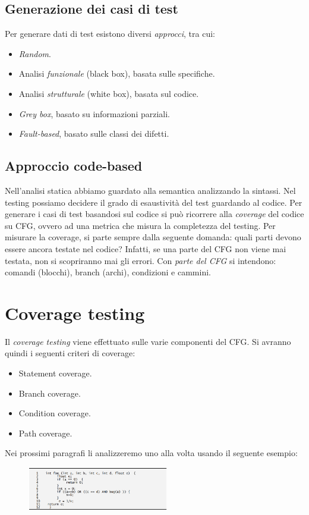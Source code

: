 \documentclass[a4paper,oneside,titlepage]{book}
\begin{document}
\subsection{Generazione dei casi di test}
Per generare dati di test esistono diversi \textit{approcci}, tra cui:
\begin{itemize}
    \item \textit{Random}.
    \item Analisi \textit{funzionale} (black box), basata sulle specifiche.
    \item Analisi \textit{strutturale} (white box), basata sul codice.
    \item \textit{Grey box}, basato su informazioni parziali.
    \item \textit{Fault-based}, basato sulle classi dei difetti.
\end{itemize}

\subsection{Approccio code-based}
Nell'analisi statica abbiamo guardato alla semantica analizzando la sintassi. Nel testing possiamo decidere il grado di esaustività del test guardando al codice. Per generare i casi di test basandosi sul codice si può ricorrere alla \textit{coverage} del codice su CFG, ovvero ad una metrica che misura la completezza del testing. Per misurare la coverage, si parte sempre dalla seguente domanda: quali parti devono essere ancora testate nel codice? Infatti, se una parte del CFG non viene mai testata, non si scopriranno mai gli errori. Con \textit{parte del CFG} si intendono: comandi (blocchi), branch (archi), condizioni e cammini.

\section{Coverage testing}
Il \textit{coverage testing} viene effettuato sulle varie componenti del CFG. Si avranno quindi i seguenti criteri di coverage:
\begin{itemize}
    \item Statement coverage.
    \item Branch coverage.
    \item Condition coverage.
    \item Path coverage.
\end{itemize}
Nei prossimi paragrafi li analizzeremo uno alla volta usando il seguente esempio:
\begin{figure}[htp]
	\centering
	\includegraphics[width=0.55\textwidth]{coverage.png}
\end{figure}
\end{document}
